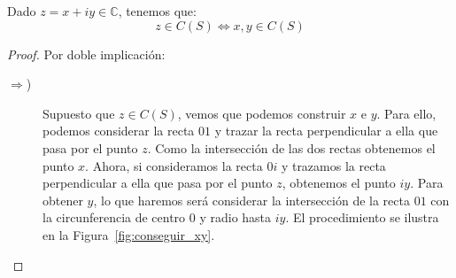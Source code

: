 \begin{lema}\label{lema:real_im}
    Dado $z=x+iy\in \mathbb{C}$, tenemos que:
    \begin{equation*}
        z\in C(S) \Longleftrightarrow x,y\in C(S)
    \end{equation*}
    \begin{proof}
        Por doble implicación:
        \begin{description}
            \item [$\Longrightarrow$)] Supuesto que $z\in C(S)$, vemos que podemos construir $x$ e $y$. Para ello, podemos considerar la recta $01$ y trazar la recta perpendicular a ella que pasa por el punto $z$. Como la intersección de las dos rectas obtenemos el punto $x$. Ahora, si consideramos la recta $0i$ y trazamos la recta perpendicular a ella que pasa por el punto $z$, obtenemos el punto $iy$. Para obtener $y$, lo que haremos será considerar la intersección de la recta $01$ con la circunferencia de centro $0$ y radio hasta $iy$. El procedimiento se ilustra en la Figura~\ref{fig:conseguir_xy}.


\end{description}
\end{proof}
\end{lema}

